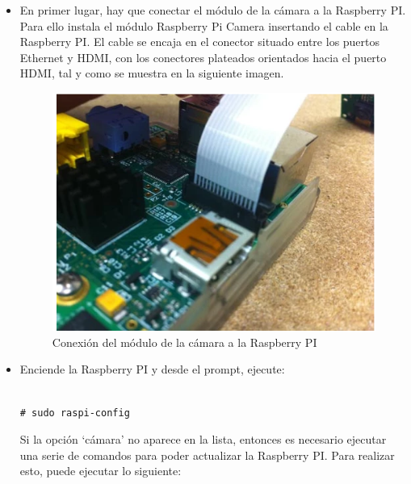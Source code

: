 \begin{itemize}

\item  En primer lugar, hay que conectar el módulo de la cámara a la Raspberry PI. Para ello instala el módulo Raspberry Pi Camera insertando el cable en la Raspberry PI. El cable se encaja en el conector situado entre los puertos Ethernet y HDMI, con los conectores plateados orientados hacia el puerto HDMI, tal y como se muestra en la siguiente imagen.


\begin{figure}[H]
	\centering
	\includegraphics[scale=0.45]{images/46}
	\caption{Conexión del módulo de la cámara a la Raspberry PI}
\end{figure}

\item Enciende la Raspberry PI y desde el prompt, ejecute:

\vspace{-1cm}

\begin{verbatim}

# sudo raspi-config

\end{verbatim}

\vspace{-1cm}

Si la opción `cámara' no aparece en la lista, entonces es necesario ejecutar una serie de comandos para poder actualizar la Raspberry PI. Para realizar esto, puede ejecutar lo siguiente:

\vspace{-1cm}


\end{itemize}
